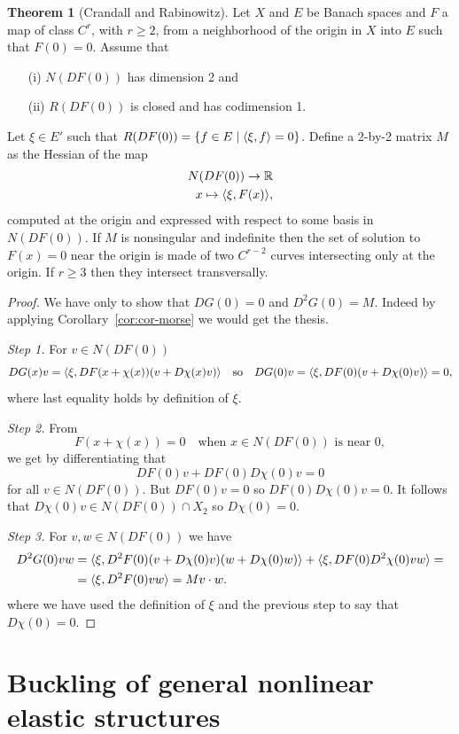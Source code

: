 \documentclass[a4paper,11pt]{article}
\theoremstyle{definition}
\newtheorem{thm}[prop]{Theorem}
\DeclarePairedDelimiter{\dual}{\langle}{\rangle}
\begin{document}
\begin{thm}[Crandall and Rabinowitz]
\label{thm:gen-bif}
Let $X$ and $E$ be Banach spaces and $F$ a map of class $C^r$, with $r\ge2$, from a neighborhood of the origin in $X$ into $E$ such that $F(0)=0$. Assume that
\begin{itemize}
\item [(i)] $N(DF(0))$ has dimension 2 and
\item[(ii)] $R(DF(0))$ is closed and has codimension 1.
\end{itemize}
Let $\xi\in E'$ such that $R(DF(0))=\{f\in E\;|\;\dual{\xi,f}=0\}$. Define a 2-by-2 matrix $M$ as the Hessian of the map
\begin{align*}
N(DF(0))\to\mathbb{R} \\
x\mapsto\dual{\xi,F(x)},
\end{align*}
computed at the origin and expressed with respect to some basis in $N(DF(0))$. If $M$ is nonsingular and indefinite then the set of solution to $F(x)=0$ near the origin is made of two $C^{r-2}$ curves intersecting only at the origin. If $r\ge3$ then they intersect transversally.
\end{thm}
\begin{proof}
We have only to show that $DG(0)=0$ and $D^2G(0)=M$. Indeed by applying Corollary~\ref{cor:cor-morse} we would get the thesis.

\emph{Step 1.} For $v\in N(DF(0))$
\[
DG(x)v=\dual{\xi,DF(x+\chi(x))(v+D\chi(x)v)}\quad\text{so}\quad DG(0)v=\dual{\xi,DF(0)(v+D\chi(0)v)}=0,
\]
where last equality holds by definition of $\xi$.

\emph{Step 2.} From
\[
F(x+\chi(x))=0\quad\text{when $x\in N(DF(0))$ is near 0},
\]
we get by differentiating that
\[
DF(0)v+DF(0)D\chi(0)v=0
\]
for all $v\in N(DF(0))$. But $DF(0)v=0$ so $DF(0)D\chi(0)v=0$. It follows that $D\chi(0)v\in N(DF(0))\cap X_2$ so $D\chi(0)=0$.

\emph{Step 3.} For $v,w\in N(DF(0))$ we have
\begin{align*}
D^2G(0)vw&=\dual{\xi,D^2F(0)(v+D\chi(0)v)(w+D\chi(0)w)}+\dual{\xi,DF(0)D^2\chi(0)vw}=\\
&=\dual{\xi,D^2F(0)vw}=Mv\cdot w.
\end{align*}
where we have used the definition of $\xi$ and the previous step to say that $D\chi(0)=0$. 
\end{proof}

\section{Buckling of general nonlinear elastic structures}
\label{sec:general-buckling}
\end{document}
